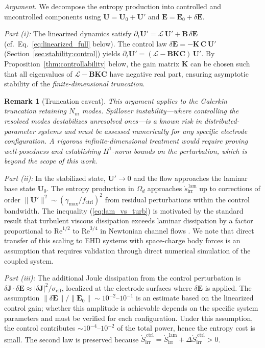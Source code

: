 \documentclass[12pt,twocolumn]{article}
\newtheorem{remark}{Remark}
\newcommand{\ee}{\mathbf{E}}
\newcommand{\jj}{\mathbf{J}}
\newcommand{\uu}{\mathbf{U}}
\newcommand{\kk}{\mathbf{K}}
\newcommand{\Lop}{\mathcal{L}}
\newcommand{\Sdot}{\dot{S}_{\mathrm{irr}}}
\newcommand{\sdot}{\dot{s}_{\mathrm{irr}}}
\begin{document}
\textit{Argument.}
We decompose the entropy production into controlled and uncontrolled
components using $\uu = \uu_0 + \uu'$ and $\ee = \ee_0 + \delta\ee$.

\textit{Part (i):} The linearized dynamics satisfy
$\partial_t \uu' = \Lop\,\uu' + \mathbf{B}\,\delta\ee$
(cf.\ Eq.~\ref{eq:linearized_full} below). The control law
$\delta\ee = -\kk\,\mathbf{C}\,\uu'$ (Section~\ref{sec:stability:control})
yields $\partial_t \uu' = (\Lop - \mathbf{B}\kk\mathbf{C})\,\uu'$.
By Proposition~\ref{thm:controllability} below, the gain matrix $\kk$
can be chosen such that all eigenvalues of $\Lop - \mathbf{B}\kk\mathbf{C}$
have negative real part, ensuring asymptotic stability of the
\emph{finite-dimensional truncation}.

\begin{remark}[Truncation caveat]
This argument applies to the Galerkin truncation retaining $N_m$
modes. Spillover instability---where controlling the resolved modes
destabilizes unresolved ones---is a known risk in distributed-parameter
systems and must be assessed numerically for any specific electrode
configuration. A rigorous infinite-dimensional treatment would require
proving well-posedness and establishing $H^1$-norm bounds on the
perturbation, which is beyond the scope of this work.
\end{remark}

\textit{Part (ii):} In the stabilized state, $\uu' \to 0$ and the
flow approaches the laminar base state $\uu_0$. The entropy production
in $\Omega_d$ approaches $\sdot^{\,\mathrm{lam}}$ up to corrections
of order $\|\uu'\|^2 \sim (\gamma_{\max}/f_{\mathrm{ctrl}})^2$
from residual perturbations within the control bandwidth.
The inequality (\ref{eq:lam_vs_turb}) is motivated by the standard
result that turbulent viscous dissipation exceeds laminar dissipation
by a factor proportional to $\mathrm{Re}^{1/2}$ to $\mathrm{Re}^{3/4}$
in Newtonian channel flows \cite{Pope2000}. We note that direct
transfer of this scaling to EHD systems with space-charge body forces
is an assumption that requires validation through direct numerical
simulation of the coupled system.

\textit{Part (iii):} The additional Joule dissipation from the
control perturbation is $\delta\jj \cdot \delta\ee \approx
|\delta\jj|^2 / \sigma_{\mathrm{eff}}$, localized at the electrode
surfaces where $\delta\ee$ is applied. The assumption
$\|\delta\ee\| / \|\ee_0\| \sim 10^{-2}$--$10^{-1}$ is an estimate
based on the linearized control gain; whether this amplitude is
achievable depends on the specific system parameters and must be
verified for each configuration. Under this assumption, the control
contributes $\sim 10^{-4}$--$10^{-2}$ of the total power, hence
the entropy cost is small. The second law is preserved because
$\Sdot^{\,\mathrm{ctrl}} = \Sdot^{\,\mathrm{lam}} +
\Delta\Sdot^{\,\mathrm{ctrl}} > 0$.
\end{document}
